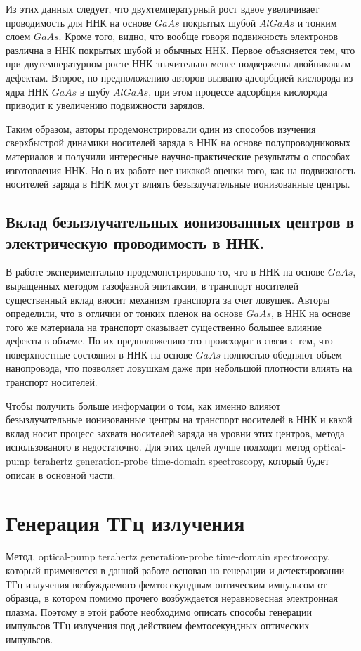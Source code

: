 \documentclass[a4paper,14pt,russian]{extreport}
\begin{document}
Из этих данных следует, что двухтемпературный рост вдвое увеличивает проводимость для ННК на основе $GaAs$ покрытых шубой $AlGaAs$ и тонким слоем $GaAs$. Кроме того, видно, что вообще говоря подвижность электронов различна в ННК покрытых шубой и обычных ННК. Первое объясняется тем, что при двутемпературном росте ННК значительно менее подвержены двойниковым дефектам. Второе, по предположению авторов \cite{CurrentLifetime} вызвано адсорбцией кислорода из ядра ННК $GaAs$ в шубу $AlGaAs$, при этом процессе адсорбция кислорода приводит к увеличению подвижности зарядов.\par
				Таким образом, авторы продемонстрировали один из способов изучения сверхбыстрой динамики носителей заряда в ННК на основе полупроводниковых материалов и получили интересные научно-практические результаты о способах изготовления ННК. Но в их работе нет никакой оценки того, как на подвижность носителей заряда в ННК могут влиять безызлучательные ионизованные центры.
			\subsection{Вклад безызлучательных ионизованных центров в электрическую проводимость в ННК.}
				В работе \cite{NonradiativeCenters} экспериментально продемонстрировано то, что в ННК на основе $GaAs$, выращенных методом газофазной эпитаксии, в транспорт носителей существенный вклад вносит механизм транспорта за счет ловушек. Авторы определили, что в отличии от тонких пленок на основе $GaAs$, в ННК на основе того же материала на транспорт оказывает существенно большее влияние дефекты в объеме. По их предположению это происходит в связи с тем, что поверхностные состояния в ННК на основе $GaAs$ полностью обедняют объем нанопровода, что позволяет ловушкам даже при небольшой плотности влиять на транспорт носителей.\par
				Чтобы получить больше информации о том, как именно влияют безызлучательные ионизованные центры на транспорт носителей в ННК и какой вклад носит процесс захвата носителей заряда на уровни этих центров, метода использованого в \cite{NonradiativeCenters} недостаточно. Для этих целей лучше подходит метод optical-pump terahertz generation-probe time-domain spectroscopy, который будет описан в основной части.
		\section{Генерация ТГц излучения}
			Метод, optical-pump terahertz generation-probe time-domain spectroscopy, который применяется в данной работе основан на генерации и детектировании ТГц излучения возбуждаемого фемтосекундным оптическим импульсом от образца, в котором помимо прочего возбуждается неравновесная электронная плазма. Поэтому в этой работе необходимо описать способы генерации импульсов ТГц излучения под действием фемтосекундных оптических импульсов.
\end{document}
